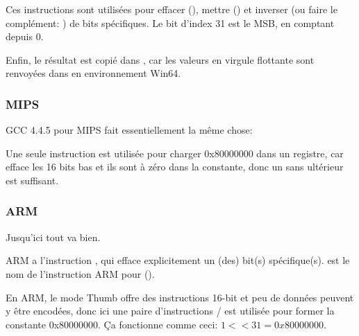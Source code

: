 Ces instructions sont utilisées pour effacer (\BTR), mettre (\BTS) et inverser (ou
faire le complément: \BTC) de bits spécifiques.
Le bit d'index 31 est le \ac{MSB}, en comptant depuis 0.

Enfin, le résultat est copié dans , car les valeurs en virgule flottante
sont renvoyées dans  en environnement Win64.

\subsubsection{MIPS}

GCC 4.4.5 pour MIPS fait essentiellement la même chose:




Une seule instruction \LUI est utilisée pour charger 0x80000000 dans un registre,
car \LUI efface les 16 bits bas et ils sont à zéro dans la constante, donc un \LUI
sans \ORI ultérieur est suffisant.

\subsubsection{ARM}

\myparagraph{\OptimizingKeilVI (\ARMMode)}



Jusqu'ici tout va bien.

ARM a l'instruction \BIC, qui efface explicitement un (des) bit(s) spécifique(s).
\EOR est le nom de l'instruction ARM pour \XOR ().

\myparagraph{\OptimizingKeilVI (\ThumbMode)}



En ARM, le mode Thumb offre des instructions 16-bit et peu de données peuvent y être
encodées, donc ici une paire d'instructions / est utilisée pour
former la constante 0x80000000.
Ça fonctionne comme ceci: $1<<31 = 0x80000000$.


